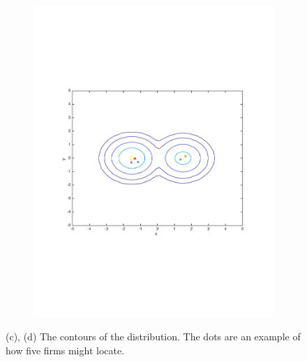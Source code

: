 \documentclass[preprint, 12pt]{elsarticle}
\begin{document}
\begin{figure}[htp!]
\begin{subfigure}[t]{0.485\textwidth}
		\includegraphics[width=\textwidth, trim={15mm 85mm 20mm 75mm}]{Graphics/contour_mu15_nratio2.pdf}
		\caption{}
		\label{fig:contour_mu15}
	\end{subfigure}
	\caption*{(c), (d) The contours of the distribution. The dots are an example of how five firms might locate.}
	

\end{figure}
\end{document}
